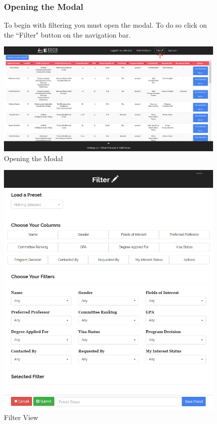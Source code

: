 \documentclass[fontsize=12pt,paper=letter,twoside]{scrartcl}
\begin{document}
\begin{figure}[!htb]
\subsubsection{Opening the Modal}
To begin with filtering you must open the modal. To do so click on the ``Filter" button on the navigation bar.
\begin{center}
\includegraphics[width=.99\textwidth]{images/open_modal.png}
\end{center}
\caption{Opening the  Modal}
\label{fig:open_modal}
\end{figure}
\clearpage

\begin{figure}[!htb]
\begin{center}
\includegraphics[width=.99\textwidth]{images/filter_view.png}
\end{center}
\caption{Filter View}
\label{fig:filter_view}
\end{figure}
\end{document}
